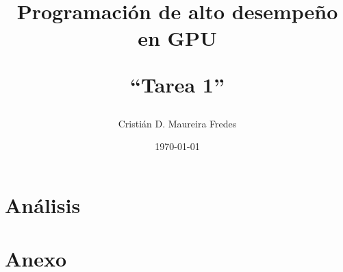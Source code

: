 \documentclass[letter, 10pt]{article}
\begin{document}

\pagestyle{empty}

\title{Programación de alto desempeño en GPU\\ \begin{Large}``Tarea 1''\end{Large}}
\author{Cristián D. Maureira Fredes}
\date{\today}
\maketitle

\section{Análisis}
\label{sec:analisis}

\newpage

\section{Anexo}
\label{sec:anexo}

\end{document}
